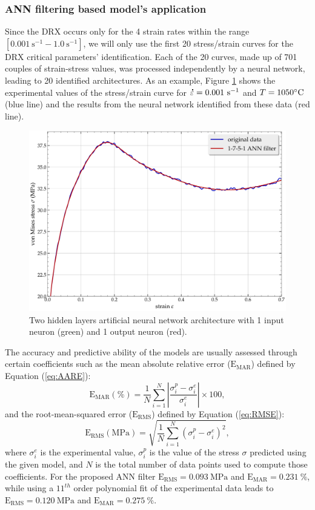 \documentclass[metals,article,submit,pdftex,moreauthors]{Definitions/mdpi}
\DeclareRobustCommand{\mdot}[1]{\accentset{\mbox{\bfseries .}}{#1}}
\DeclareRobustCommand{\RMSE}{\text{E}_\text{RMS}}
\DeclareRobustCommand{\MARE}{\text{E}_\text{MAR}}
\DeclareRobustCommand{\ps}{\text{s}^{-1}}
\DeclareRobustCommand{\MPa}{\text{MPa}}
\begin{document}
\subsubsection{ANN filtering based model's application \label{subsec:ANNapplication}}
Since the DRX occurs only for the 4 strain rates within the range $[0.001~\ps-1.0~\ps]$, we will only use the first 20 stress/strain curves for the DRX critical parameters' identification.
Each of the 20 curves, made up of 701 couples of strain-stress values, was processed independently by a neural network, leading to 20 identified architectures.
As an example, Figure \ref{fig:AnnFit} shows the experimental values of the stress/strain curve for $\mdot\varepsilon=0.001~\ps$ and $T=1050\celsius$ (blue line) and the results from the neural network identified from these data (red line).
\begin{figure}[H]
\includegraphics[width=0.7\columnwidth]{Figures/AnnFit}
\caption{Two hidden layers artificial neural network architecture with 1 input neuron (green) and 1 output neuron (red).}
\label{fig:AnnFit}
\end{figure}
The accuracy and predictive ability of the models are usually assessed through certain coefficients such as the mean absolute relative error ($\MARE$) defined by Equation (\ref{eq:AARE}):
\begin{equation}
\MARE(\%) = \frac{1}{N} \sum_{i=1}^{N}{\left|\frac{\sigma_i^p -\sigma_i^e}{\sigma_i^e}\right|} \times 100, \label{eq:AARE}
\end{equation}
and the root-mean-squared error ($\RMSE$) defined by Equation (\ref{eq:RMSE}):
\begin{equation}
\RMSE (\MPa) = \sqrt{\frac{1}{N} \sum_{i=1}^{N} \left(\sigma_i^p - \sigma_i^e\right)^2}, \label{eq:RMSE}
\end{equation}
where $\sigma_i^e$ is the experimental value, $\sigma_i^p$ is the value of the stress $\sigma$ predicted using the given model, and $N$ is the total number of data points used to compute those coefficients.
For the proposed ANN filter $\RMSE=0.093~\MPa$ and $\MARE=0.231~\%$, while using a $11^{th}$ order polynomial fit of the experimental data leads to $\RMSE=0.120~\MPa$ and $\MARE=0.275~\%$.
\end{document}
